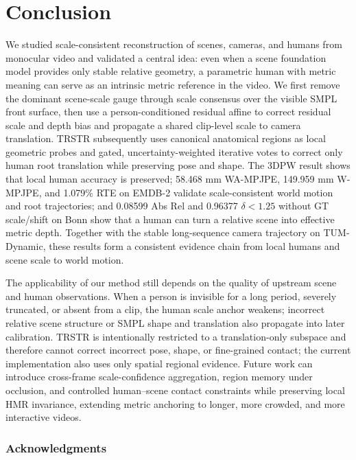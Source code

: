 \documentclass{article}
\begin{document}
\section{Conclusion}\label{sec:conclusion}

We studied scale-consistent reconstruction of scenes, cameras, and humans from monocular video and validated a central idea: even when a scene foundation model provides only stable relative geometry, a parametric human with metric meaning can serve as an intrinsic metric reference in the video. We first remove the dominant scene-scale gauge through scale consensus over the visible SMPL front surface, then use a person-conditioned residual affine to correct residual scale and depth bias and propagate a shared clip-level scale to camera translation. TRSTR subsequently uses canonical anatomical regions as local geometric probes and gated, uncertainty-weighted iterative votes to correct only human root translation while preserving pose and shape. The 3DPW result shows that local human accuracy is preserved; 58.468 mm WA-MPJPE, 149.959 mm W-MPJPE, and 1.079\% RTE on EMDB-2 validate scale-consistent world motion and root trajectories; and 0.08599 Abs Rel and 0.96377 $\delta<1.25$ without GT scale/shift on Bonn show that a human can turn a relative scene into effective metric depth. Together with the stable long-sequence camera trajectory on TUM-Dynamic, these results form a consistent evidence chain from local humans and scene scale to world motion.

The applicability of our method still depends on the quality of upstream scene and human observations. When a person is invisible for a long period, severely truncated, or absent from a clip, the human scale anchor weakens; incorrect relative scene structure or SMPL shape and translation also propagate into later calibration. TRSTR is intentionally restricted to a translation-only subspace and therefore cannot correct incorrect pose, shape, or fine-grained contact; the current implementation also uses only spatial regional evidence. Future work can introduce cross-frame scale-confidence aggregation, region memory under occlusion, and controlled human--scene contact constraints while preserving local HMR invariance, extending metric anchoring to longer, more crowded, and more interactive videos.

\subsubsection*{Acknowledgments}
\end{document}
